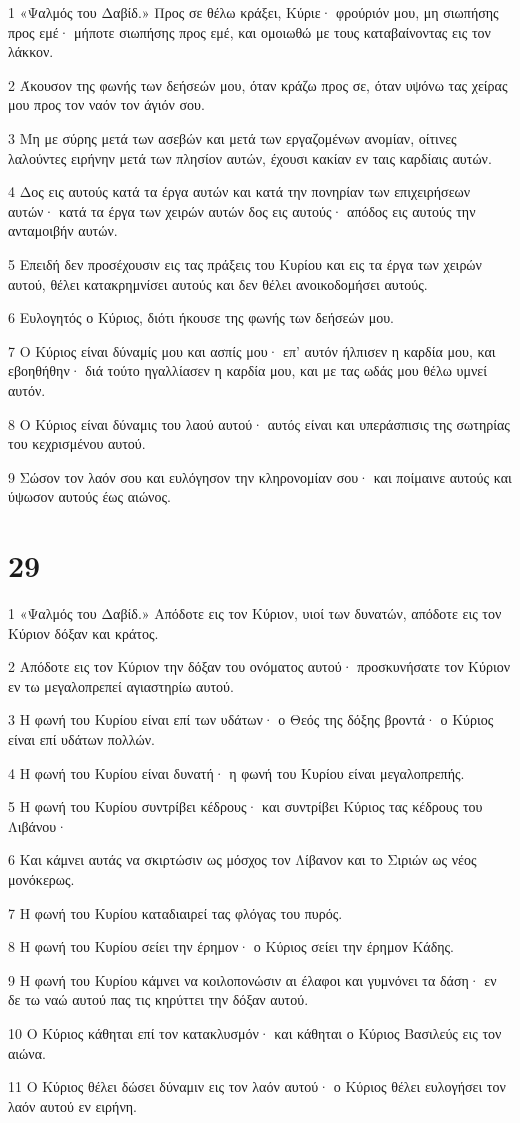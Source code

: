 \par 1 «Ψαλμός του Δαβίδ.» Προς σε θέλω κράξει, Κύριε· φρούριόν μου, μη σιωπήσης προς εμέ· μήποτε σιωπήσης προς εμέ, και ομοιωθώ με τους καταβαίνοντας εις τον λάκκον.
\par 2 Άκουσον της φωνής των δεήσεών μου, όταν κράζω προς σε, όταν υψόνω τας χείρας μου προς τον ναόν τον άγιόν σου.
\par 3 Μη με σύρης μετά των ασεβών και μετά των εργαζομένων ανομίαν, οίτινες λαλούντες ειρήνην μετά των πλησίον αυτών, έχουσι κακίαν εν ταις καρδίαις αυτών.
\par 4 Δος εις αυτούς κατά τα έργα αυτών και κατά την πονηρίαν των επιχειρήσεων αυτών· κατά τα έργα των χειρών αυτών δος εις αυτούς· απόδος εις αυτούς την ανταμοιβήν αυτών.
\par 5 Επειδή δεν προσέχουσιν εις τας πράξεις του Κυρίου και εις τα έργα των χειρών αυτού, θέλει κατακρημνίσει αυτούς και δεν θέλει ανοικοδομήσει αυτούς.
\par 6 Ευλογητός ο Κύριος, διότι ήκουσε της φωνής των δεήσεών μου.
\par 7 Ο Κύριος είναι δύναμίς μου και ασπίς μου· επ' αυτόν ήλπισεν η καρδία μου, και εβοηθήθην· διά τούτο ηγαλλίασεν η καρδία μου, και με τας ωδάς μου θέλω υμνεί αυτόν.
\par 8 Ο Κύριος είναι δύναμις του λαού αυτού· αυτός είναι και υπεράσπισις της σωτηρίας του κεχρισμένου αυτού.
\par 9 Σώσον τον λαόν σου και ευλόγησον την κληρονομίαν σου· και ποίμαινε αυτούς και ύψωσον αυτούς έως αιώνος.

\chapter{29}

\par 1 «Ψαλμός του Δαβίδ.» Απόδοτε εις τον Κύριον, υιοί των δυνατών, απόδοτε εις τον Κύριον δόξαν και κράτος.
\par 2 Απόδοτε εις τον Κύριον την δόξαν του ονόματος αυτού· προσκυνήσατε τον Κύριον εν τω μεγαλοπρεπεί αγιαστηρίω αυτού.
\par 3 Η φωνή του Κυρίου είναι επί των υδάτων· ο Θεός της δόξης βροντά· ο Κύριος είναι επί υδάτων πολλών.
\par 4 Η φωνή του Κυρίου είναι δυνατή· η φωνή του Κυρίου είναι μεγαλοπρεπής.
\par 5 Η φωνή του Κυρίου συντρίβει κέδρους· και συντρίβει Κύριος τας κέδρους του Λιβάνου·
\par 6 Και κάμνει αυτάς να σκιρτώσιν ως μόσχος τον Λίβανον και το Σιριών ως νέος μονόκερως.
\par 7 Η φωνή του Κυρίου καταδιαιρεί τας φλόγας του πυρός.
\par 8 Η φωνή του Κυρίου σείει την έρημον· ο Κύριος σείει την έρημον Κάδης.
\par 9 Η φωνή του Κυρίου κάμνει να κοιλοπονώσιν αι έλαφοι και γυμνόνει τα δάση· εν δε τω ναώ αυτού πας τις κηρύττει την δόξαν αυτού.
\par 10 Ο Κύριος κάθηται επί τον κατακλυσμόν· και κάθηται ο Κύριος Βασιλεύς εις τον αιώνα.
\par 11 Ο Κύριος θέλει δώσει δύναμιν εις τον λαόν αυτού· ο Κύριος θέλει ευλογήσει τον λαόν αυτού εν ειρήνη.

